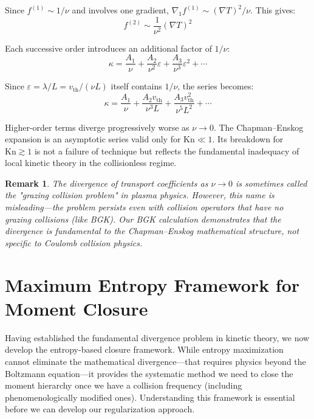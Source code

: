 \documentclass[12pt,a4paper]{article}
\newtheorem{remark}[theorem]{Remark}
\newcommand{\Kn}{\text{Kn}}
\begin{document}
Since $f^{(1)} \sim 1/\nu$ and involves one gradient, $\nabla_1 f^{(1)} \sim (\nabla T)^2/\nu$. This gives:
\begin{equation}
f^{(2)} \sim \frac{1}{\nu^2} (\nabla T)^2
\label{eq:second_order_scaling}
\end{equation}

Each successive order introduces an additional factor of $1/\nu$:
\begin{equation}
\kappa = \frac{A_1}{\nu} + \frac{A_2}{\nu^2}\varepsilon + \frac{A_3}{\nu^3}\varepsilon^2 + \cdots
\label{eq:ce_series}
\end{equation}

Since $\varepsilon = \lambda/L = v_{\text{th}}/(\nu L)$ itself contains $1/\nu$, the series becomes:
\begin{equation}
\kappa = \frac{A_1}{\nu} + \frac{A_2 v_{\text{th}}}{\nu^3 L} + \frac{A_3 v_{\text{th}}^2}{\nu^5 L^2} + \cdots
\label{eq:ce_series_expanded}
\end{equation}

Higher-order terms diverge progressively worse as $\nu \to 0$. The Chapman--Enskog expansion is an asymptotic series valid only for $\Kn \ll 1$. Its breakdown for $\Kn \gtrsim 1$ is not a failure of technique but reflects the fundamental inadequacy of local kinetic theory in the collisionless regime.

\begin{remark}
The divergence of transport coefficients as $\nu \to 0$ is sometimes called the "grazing collision problem" in plasma physics. However, this name is misleading—the problem persists even with collision operators that have no grazing collisions (like BGK). Our BGK calculation demonstrates that the divergence is fundamental to the Chapman--Enskog mathematical structure, not specific to Coulomb collision physics.
\end{remark}

\section{Maximum Entropy Framework for Moment Closure}

Having established the fundamental divergence problem in kinetic theory, we now develop the entropy-based closure framework. While entropy maximization cannot eliminate the mathematical divergence—that requires physics beyond the Boltzmann equation—it provides the systematic method we need to close the moment hierarchy once we have a collision frequency (including phenomenologically modified ones). Understanding this framework is essential before we can develop our regularization approach.
\end{document}
